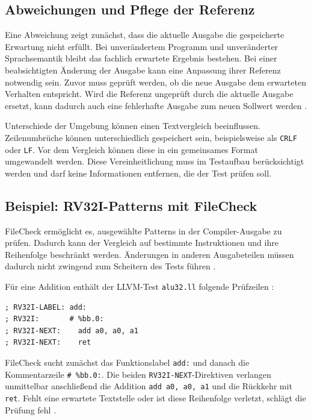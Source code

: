 \documentclass[11pt,a4paper]{article}
\newcommand{\code}[1]{\texttt{#1}}
\begin{document}
\subsection{Abweichungen und Pflege der Referenz}
Eine Abweichung zeigt zunächst, dass die aktuelle Ausgabe die gespeicherte Erwartung nicht erfüllt. Bei unverändertem Programm und unveränderter Sprachsemantik bleibt das fachlich erwartete Ergebnis bestehen. Bei einer beabsichtigten Änderung der Ausgabe kann eine Anpassung ihrer Referenz notwendig sein. Zuvor muss geprüft werden, ob die neue Ausgabe dem erwarteten Verhalten entspricht. Wird die Referenz ungeprüft durch die aktuelle Ausgabe ersetzt, kann dadurch auch eine fehlerhafte Ausgabe zum neuen Sollwert werden \cite{suiteguide}.

Unterschiede der Umgebung können einen Textvergleich beeinflussen. Zeilenumbrüche können unterschiedlich gespeichert sein, beispielsweise als \code{CRLF} oder \code{LF}. Vor dem Vergleich können diese in ein gemeinsames Format umgewandelt werden. Diese Vereinheitlichung muss im Testaufbau berücksichtigt werden und darf keine Informationen entfernen, die der Test prüfen soll.

\subsection{Beispiel: RV32I-Patterns mit FileCheck}
FileCheck ermöglicht es, ausgewählte Patterns in der Compiler-Ausgabe
zu prüfen. Dadurch kann der Vergleich auf bestimmte Instruktionen
und ihre Reihenfolge beschränkt werden. Änderungen in anderen
Ausgabeteilen müssen dadurch nicht zwingend zum Scheitern des Tests führen
\cite{filecheck}.

Für eine Addition enthält der LLVM-Test \code{alu32.ll} folgende
Prüfzeilen \cite{rvtest}:

\par\noindent\begin{minipage}{\linewidth}
\begin{lstlisting}[caption={Originale RV32I-Prüfzeilen aus alu32.ll}]
; RV32I-LABEL: add:
; RV32I:       # %bb.0:
; RV32I-NEXT:    add a0, a0, a1
; RV32I-NEXT:    ret
\end{lstlisting}
\end{minipage}\par

FileCheck sucht zunächst das Funktionslabel \code{add:} und danach
die Kommentarzeile \code{\# \%bb.0:}. Die beiden
\code{RV32I-NEXT}-Direktiven verlangen unmittelbar anschließend
die Addition \code{add a0, a0, a1} und die Rückkehr mit \code{ret}.
Fehlt eine erwartete Textstelle oder ist diese Reihenfolge verletzt,
schlägt die Prüfung fehl \cite{filecheck,rvtest}.
\end{document}
